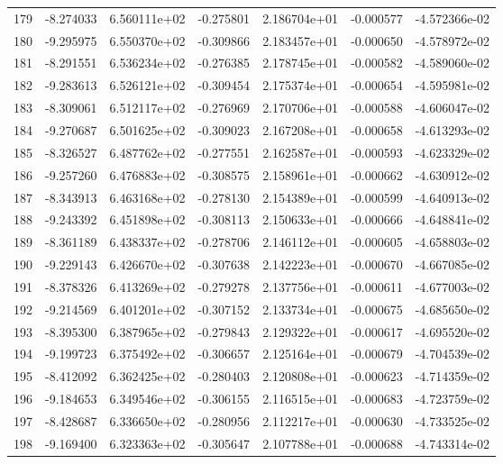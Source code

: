 \begin{tabular}{rrrrrrr}
 179 &  -8.274033 &  6.560111e+02 & -0.275801 &  2.186704e+01 &   -0.000577 & -4.572366e-02 \\
 180 &  -9.295975 &  6.550370e+02 & -0.309866 &  2.183457e+01 &   -0.000650 & -4.578972e-02 \\
 181 &  -8.291551 &  6.536234e+02 & -0.276385 &  2.178745e+01 &   -0.000582 & -4.589060e-02 \\
 182 &  -9.283613 &  6.526121e+02 & -0.309454 &  2.175374e+01 &   -0.000654 & -4.595981e-02 \\
 183 &  -8.309061 &  6.512117e+02 & -0.276969 &  2.170706e+01 &   -0.000588 & -4.606047e-02 \\
 184 &  -9.270687 &  6.501625e+02 & -0.309023 &  2.167208e+01 &   -0.000658 & -4.613293e-02 \\
 185 &  -8.326527 &  6.487762e+02 & -0.277551 &  2.162587e+01 &   -0.000593 & -4.623329e-02 \\
 186 &  -9.257260 &  6.476883e+02 & -0.308575 &  2.158961e+01 &   -0.000662 & -4.630912e-02 \\
 187 &  -8.343913 &  6.463168e+02 & -0.278130 &  2.154389e+01 &   -0.000599 & -4.640913e-02 \\
 188 &  -9.243392 &  6.451898e+02 & -0.308113 &  2.150633e+01 &   -0.000666 & -4.648841e-02 \\
 189 &  -8.361189 &  6.438337e+02 & -0.278706 &  2.146112e+01 &   -0.000605 & -4.658803e-02 \\
 190 &  -9.229143 &  6.426670e+02 & -0.307638 &  2.142223e+01 &   -0.000670 & -4.667085e-02 \\
 191 &  -8.378326 &  6.413269e+02 & -0.279278 &  2.137756e+01 &   -0.000611 & -4.677003e-02 \\
 192 &  -9.214569 &  6.401201e+02 & -0.307152 &  2.133734e+01 &   -0.000675 & -4.685650e-02 \\
 193 &  -8.395300 &  6.387965e+02 & -0.279843 &  2.129322e+01 &   -0.000617 & -4.695520e-02 \\
 194 &  -9.199723 &  6.375492e+02 & -0.306657 &  2.125164e+01 &   -0.000679 & -4.704539e-02 \\
 195 &  -8.412092 &  6.362425e+02 & -0.280403 &  2.120808e+01 &   -0.000623 & -4.714359e-02 \\
 196 &  -9.184653 &  6.349546e+02 & -0.306155 &  2.116515e+01 &   -0.000683 & -4.723759e-02 \\
 197 &  -8.428687 &  6.336650e+02 & -0.280956 &  2.112217e+01 &   -0.000630 & -4.733525e-02 \\
 198 &  -9.169400 &  6.323363e+02 & -0.305647 &  2.107788e+01 &   -0.000688 & -4.743314e-02 \\

\end{tabular}
